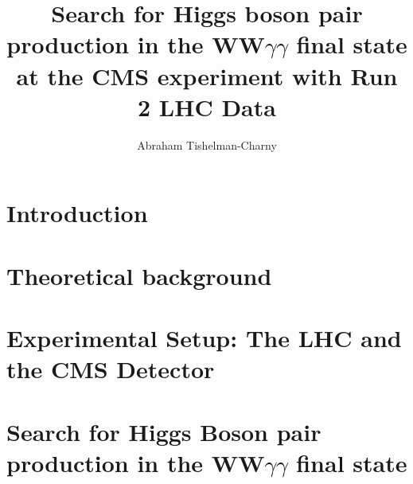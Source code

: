\documentclass[thesis]{neu}
\title{
Search for Higgs boson pair production in the \texorpdfstring{WW$\gamma\gamma$}{WWyy} final state \\ \newline at the CMS experiment with Run 2 LHC Data
}
\author{Abraham Tishelman-Charny}
\begin{document}
\newpage 

 

\setcounter{RenderPreAnalysisSections}{1}

\setcounter{RenderAnalysisSection}{1}

\setcounter{RenderAppendices}{1}


{

    \chapter{Introduction} \label{ch:introduction}
    
    
    \chapter{Theoretical background} \label{chapter:TheoreticalBackground}
    
    
    \chapter{Experimental Setup: The LHC and the CMS Detector} \label{chapter:Experimental_Setup}
    
    
    

}
{

}

{
    \chapter{Search for Higgs Boson pair production in the WW\texorpdfstring{$\gamma\gamma$}{yy} final state} \label{chapter:HHWWyy}
    
} 
{
}    
\end{document}
